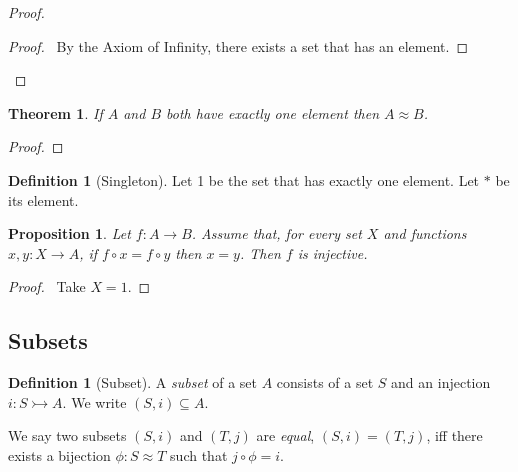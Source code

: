 \documentclass{book}
\let\qed\relax
\newtheorem{prop}[ax]{Proposition}
\newtheorem{thm}[ax]{Theorem}
\theoremstyle{definition}
\newtheorem{df}[ax]{Definition}
\begin{document}
\begin{proof}
\pf
{}
\begin{proof}
	\pf\ By the Axiom of Infinity, there exists a set that has an element.
\end{proof}
\qed
\end{proof}

\begin{thm}
If $A$ and $B$ both have exactly one element then $A \approx B$.
\end{thm}

\begin{proof}
\pf
{}
\qed
\end{proof}

\begin{df}[Singleton]
Let 1 be the set that has exactly one element. Let $*$ be its element.
\end{df}

\begin{prop}
Let $f : A \rightarrow B$. Assume that, for every set $X$ and functions $x,y : X \rightarrow A$, if $f \circ x = f \circ y$ then $x = y$. Then $f$ is injective.
\end{prop}

\begin{proof}
\pf\ Take $X = 1$. \qed
\end{proof}

\subsection{Subsets} %

\begin{df}[Subset]
A \emph{subset} of a set $A$ consists of a set $S$ and an injection $i : S \rightarrowtail A$. We write $(S,i) \subseteq A$.

We say two subsets $(S,i)$ and $(T,j)$ are \emph{equal}, $(S,i) = (T,j)$, iff there exists a bijection $\phi : S \approx T$ such that $j \circ \phi = i$.
\end{df}
\end{document}
